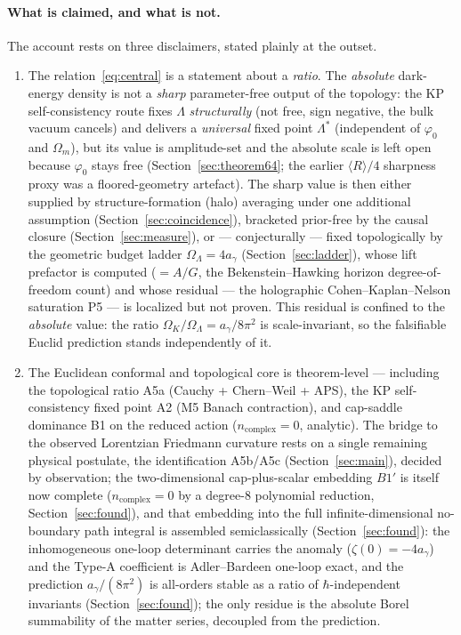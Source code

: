 \documentclass[11pt,a4paper]{article}
\theoremstyle{plain}
\theoremstyle{definition}
\theoremstyle{remark}
\newcommand{\Ok}{\Omega_K}
\newcommand{\OL}{\Omega_\Lambda}
\newcommand{\ag}{a_\gamma}
\begin{document}
\paragraph{What is claimed, and what is not.} The account rests on three disclaimers, stated plainly at the outset.
\begin{enumerate}[leftmargin=*,nosep]
\item The relation~\eqref{eq:central} is a statement about a \emph{ratio}. The \emph{absolute}
dark-energy density is not a \emph{sharp} parameter-free output of the topology: the KP
self-consistency route fixes $\Lambda$ \emph{structurally} (not free, sign negative, the bulk
vacuum cancels) and delivers a \emph{universal} fixed point $\Lambda^*$ (independent of
$\varphi_0$ and $\Omega_m$), but its value is amplitude-set and the absolute scale is left open
because $\varphi_0$ stays free (Section~\ref{sec:theorem64}; the earlier $\langle R\rangle/4$
sharpness proxy was a floored-geometry artefact). The sharp value is then either supplied by
structure-formation (halo) averaging under one additional assumption
(Section~\ref{sec:coincidence}), bracketed prior-free by the causal closure
(Section~\ref{sec:measure}), or --- conjecturally --- fixed topologically by the geometric budget
ladder $\OL = 4\ag$ (Section~\ref{sec:ladder}), whose lift prefactor is computed ($=A/G$, the
Bekenstein--Hawking horizon degree-of-freedom count) and whose residual --- the holographic
Cohen--Kaplan--Nelson saturation P5 --- is localized but not proven. This residual is
confined to the \emph{absolute} value: the ratio $\Ok/\OL=\ag/8\pi^2$ is scale-invariant, so the
falsifiable Euclid prediction stands independently of it.
\item The Euclidean conformal and topological core is theorem-level --- including the
topological ratio A5a (Cauchy + Chern--Weil + APS), the KP self-consistency fixed point A2
(M5 Banach contraction), and cap-saddle dominance B1 on the reduced action ($n_{\mathrm{complex}}
= 0$, analytic). The bridge to the observed Lorentzian Friedmann curvature rests on a single
remaining physical postulate, the identification A5b/A5c (Section~\ref{sec:main}), decided by
observation; the two-dimensional cap-plus-scalar embedding $B1'$ is itself now complete ($n_{\mathrm{complex}}=0$ by a degree-$8$ polynomial reduction, Section~\ref{sec:found}), and that embedding into the full infinite-dimensional no-boundary path integral is assembled semiclassically (Section~\ref{sec:found}): the inhomogeneous one-loop determinant carries the anomaly ($\zeta(0)=-4\ag$) and the Type-A coefficient is Adler--Bardeen one-loop exact, and the prediction $\ag/(8\pi^2)$ is all-orders stable as a ratio of $\hbar$-independent invariants (Section~\ref{sec:found}); the only residue is the absolute Borel summability of the matter series, decoupled from the prediction.

\end{enumerate}
\end{document}
